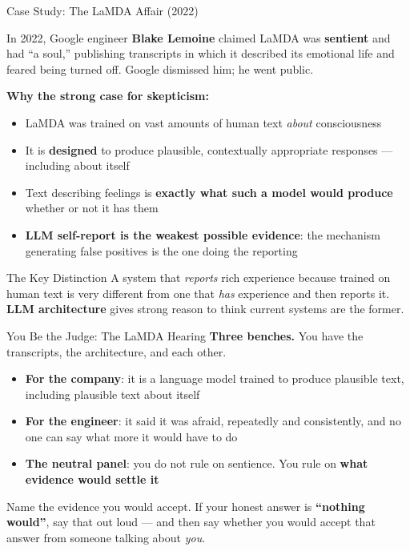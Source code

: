 \documentclass[aspectratio=169,11pt]{beamer}
\begin{document}
\begin{frame}[shrink=8]{Case Study: The LaMDA Affair (2022)}
\begin{casestudybox}
\small
In 2022, Google engineer \textbf{Blake Lemoine} claimed LaMDA was \textbf{sentient} and had ``a soul,'' publishing transcripts in which it described its emotional life and feared being turned off. Google dismissed him; he went public.
\end{casestudybox}

\textbf{Why the strong case for skepticism:}
\begin{itemize}
    \item LaMDA was trained on vast amounts of human text \emph{about} consciousness
    \item It is \textbf{designed} to produce plausible, contextually appropriate responses --- including about itself
    \item Text describing feelings is \textbf{exactly what such a model would produce} whether or not it has them
    \item \textbf{LLM self-report is the weakest possible evidence}: the mechanism generating false positives is the one doing the reporting
\end{itemize}

\begin{alertblock}{The Key Distinction}
\scriptsize
A system that \emph{reports} rich experience because trained on human text is very different from one that \emph{has} experience and then reports it. \textbf{LLM architecture} gives strong reason to think current systems are the former.
\end{alertblock}
\end{frame}
\begin{frame}[shrink=8]{You Be the Judge: The LaMDA Hearing}
\textbf{Three benches.} You have the transcripts, the architecture, and each other.

\begin{itemize}
    \item \textbf{For the company}: it is a language model trained to produce plausible text, including plausible text about itself
    \item \textbf{For the engineer}: it said it was afraid, repeatedly and consistently, and no one can say what more it would have to do
    \item \textbf{The neutral panel}: you do not rule on sentience. You rule on \textbf{what evidence would settle it}
\end{itemize}

\begin{discussionbox}
Name the evidence you would accept. If your honest answer is \textbf{``nothing would''}, say that out loud --- and then say whether you would accept that answer from someone talking about \emph{you}.
\end{discussionbox}
\end{frame}
\end{document}

